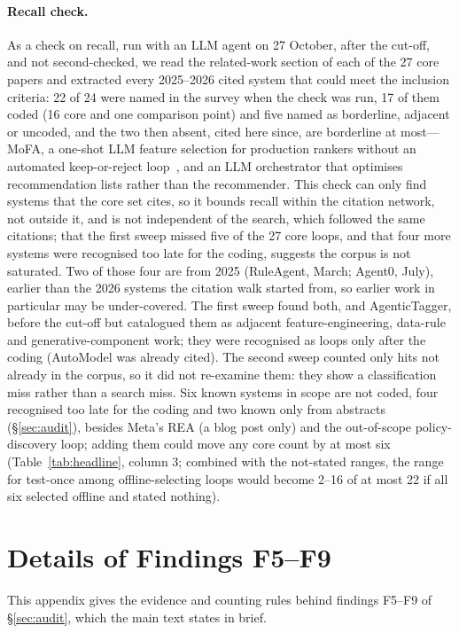 \documentclass[sigconf,nonacm]{acmart}
\begin{document}
\paragraph{Recall check.} As a check on recall, run with an LLM agent on 27 October, after the cut-off, and not second-checked, we read the related-work section of each of the 27 core papers and extracted every
2025--2026 cited system that could meet the inclusion criteria: 22 of 24 were named in the survey when the check was run, 17 of them coded (16 core and one comparison point) and five
named as borderline, adjacent or uncoded, and the two then absent, cited here since, are borderline at most---MoFA, a one-shot
LLM feature selection for production rankers without an automated keep-or-reject loop~\cite{zhou2026mofa}, and
an LLM orchestrator that optimises recommendation lists rather than the recommender. This check can only find systems
that the core set cites, so it bounds recall within the citation network, not outside it, and is not independent of the search, which followed the same citations; that the first sweep missed five of the 27 core loops, and that four more systems were recognised too late for the coding, suggests the corpus is not saturated. Two of those four are from 2025 (RuleAgent, March; Agent0, July), earlier than the 2026 systems the citation walk started from, so earlier work in particular may be under-covered. The first sweep found both, and AgenticTagger, before the cut-off but catalogued them as adjacent feature-engineering, data-rule and generative-component work; they were recognised as loops only after the coding (AutoModel was already cited). The second sweep counted only hits not already in the corpus, so it did not re-examine them: they show a classification miss rather than a search miss. Six known systems in scope are not coded, four recognised too late for the coding and two
known only from abstracts (\S\ref{sec:audit}), besides Meta's REA (a blog post only) and the out-of-scope policy-discovery loop; adding them could move any core count by at most six (Table~\ref{tab:headline}, column 3; combined with the not-stated ranges, the
range for test-once among offline-selecting loops would become 2--16 of at most 22 if all six selected offline and
stated nothing).

\section{Details of Findings F5--F9}\label{app:details}

This appendix gives the evidence and counting rules behind findings F5--F9 of \S\ref{sec:audit}, which the main text
states in brief.
\end{document}
